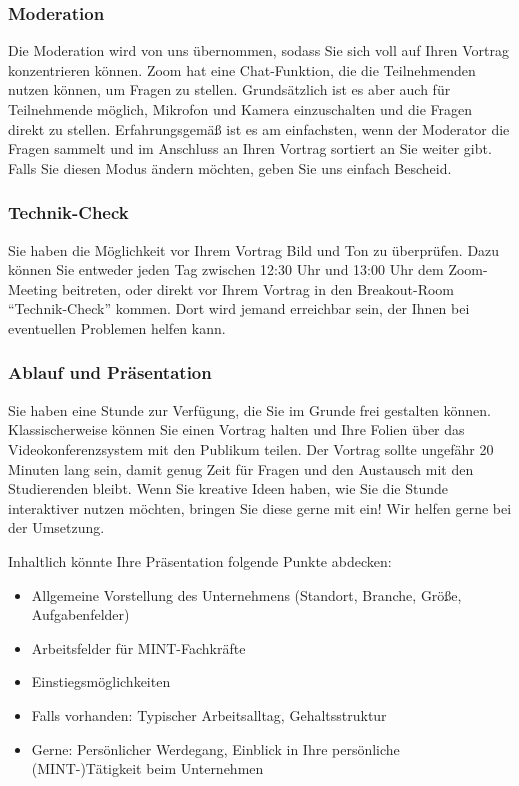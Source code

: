 \documentclass[
  paper=a4,
  fontsize=12pt,
  DIV=16,
  headheight=30pt,
  footheight=45pt,
  headinclude,
  parskip=half,
]{scrartcl}
\begin{document}
\subsubsection*{Moderation}
Die Moderation wird von uns übernommen, sodass Sie sich voll auf Ihren Vortrag konzentrieren können.
Zoom hat eine Chat-Funktion, die die Teilnehmenden nutzen können, um Fragen zu stellen.
Grundsätzlich ist es aber auch für Teilnehmende möglich, Mikrofon und Kamera einzuschalten und die Fragen direkt zu stellen.
Erfahrungsgemäß ist es am einfachsten, wenn der Moderator die Fragen sammelt und im Anschluss an Ihren Vortrag sortiert an Sie weiter gibt.
Falls Sie diesen Modus ändern möchten, geben Sie uns einfach Bescheid.


\subsubsection*{Technik-Check}
Sie haben die Möglichkeit vor Ihrem Vortrag Bild und Ton zu überprüfen.
Dazu können Sie entweder jeden Tag zwischen 12:30 Uhr und 13:00 Uhr dem Zoom-Meeting beitreten, oder direkt vor Ihrem Vortrag in den Breakout-Room \enquote{Technik-Check} kommen.
Dort wird jemand erreichbar sein, der Ihnen bei eventuellen Problemen helfen kann.


\subsubsection*{Ablauf und Präsentation}
Sie haben eine Stunde zur Verfügung, die Sie im Grunde frei gestalten können.
Klassischerweise können Sie einen Vortrag halten und Ihre Folien über das Videokonferenzsystem mit den Publikum teilen.
Der Vortrag sollte ungefähr 20 Minuten lang sein, damit genug Zeit für Fragen und den Austausch mit den Studierenden bleibt.
Wenn Sie kreative Ideen haben, wie Sie die Stunde interaktiver nutzen möchten, bringen Sie diese gerne mit ein!
Wir helfen gerne bei der Umsetzung.

Inhaltlich könnte Ihre Präsentation folgende Punkte abdecken:
\begin{itemize}
    \item Allgemeine Vorstellung des Unternehmens (Standort, Branche, Größe, Aufgabenfelder)
    \item Arbeitsfelder für MINT-Fachkräfte
    \item Einstiegsmöglichkeiten
    \item Falls vorhanden: Typischer Arbeitsalltag, Gehaltsstruktur
    \item Gerne: Persönlicher Werdegang, Einblick in Ihre persönliche (MINT-)Tätigkeit beim Unternehmen
\end{itemize} 
\end{document}
